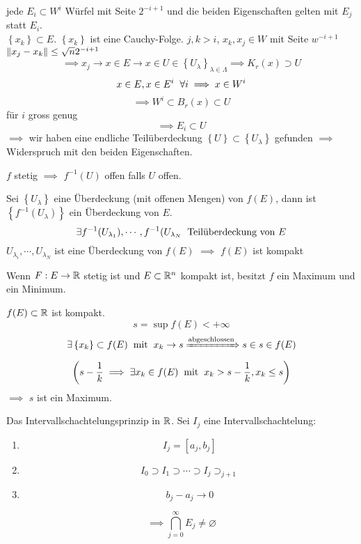 \begin{Bew}
  jede $E_i\subset W^i$ Würfel mit Seite $2^{-i+1}$ und die beiden Eigenschaften gelten mit $E_j$ statt $E_i$.\\
  $\left\{ x_k \right\}\subset E$. $\left\{ x_k \right\}$ ist eine Cauchy-Folge. $j,k>i$, $x_k,x_j\in W$ mit Seite $w^{-i+1}$ $\left\| x_j-x_k \right\|\leq \sqrt{n}2^{-i+1}$
  \[\implies x_j\to x\in E\to x\in U\in \left\{ U_\lambda \right\}_{\lambda\in\Lambda}\implies K_r(x)\supset U\]
  \[x\in E, x\in E^i\hspace{2mm}\forall i\implies x\in W^i\]
  \[\implies W^i\subset B_r(x)\subset U\]
  für $i$ gross genug
  \[\implies E_i\subset U\]
  $\implies$ wir haben eine endliche Teilüberdeckung $\left\{ U \right\}\subset\left\{ U_\lambda \right\}$ gefunden $\implies$ Widerspruch mit den beiden Eigenschaften.
\end{Bew}
\begin{Bem}
  $f$ stetig $\implies$ $f^{-1}(U)$ offen falls $U$ offen.
\end{Bem}
\begin{Bew}
  Sei $\left\{ U_\lambda \right\}$ eine Überdeckung (mit offenen Mengen) von $f(E)$, dann ist $\left\{ f^{-1}\left( U_\lambda \right) \right\}$ ein Überdeckung von $E$.
  \[\exists f^{-1}(U_{\lambda_1}),\cdots,f^{-1}(U_{\lambda_N}\hspace{2mm}\text{Teilüberdeckung von $E$}\]
  $U_{\lambda_i},\cdots,U_{\lambda_N}$ ist eine Überdeckung von $f(E)$ $\implies$ $f(E)$ ist kompakt
\end{Bew}
\begin{Kor}
  Wenn $F:E\to \mathbb{R}$ stetig ist und $E\subset\mathbb{R}^n$ kompakt ist, besitzt $f$ ein Maximum und ein Minimum.
\end{Kor}
\begin{Bew}
  $f(E)\subset\mathbb{R}$ ist kompakt.
  \[s=\sup f(E)<+\infty\]
  \[\exists \left\{ x_k \right\}\subset f(E)\hspace{2mm}\text{mit}\hspace{2mm} x_k\to s\xRightarrow{\text{abgeschlossen}}s\in s\in f(E)\]
  \[\left( s-\frac{1}{k}\implies \exists x_k\in f(E)\hspace{2mm}\text{mit}\hspace{2mm} x_k>s-\frac{1}{k},x_k\leq s \right)\]
  $\implies$ $s$ ist ein Maximum.
\end{Bew}
\begin{Def}
  Das Intervallschachtelungsprinzip in $\mathbb{R}$. Sei $I_j$ eine Intervallschachtelung:
  \begin{enumerate}
    \item \[I_j=\left[ a_j,b_j \right]\]
    \item \[I_0\supset I_1\supset \cdots \supset I_j\supset_{j+1}\]
    \item \[b_j-a_j\to 0\]
  \end{enumerate}
  \[\implies \bigcap^\infty_{j=0}E_j\neq\varnothing\]
\end{Def}
